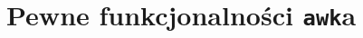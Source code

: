 \documentclass[10pt,t]{beamer}
\begin{document}

















\section{Pewne funkcjonalności \texttt{awk}a}


\end{document}
